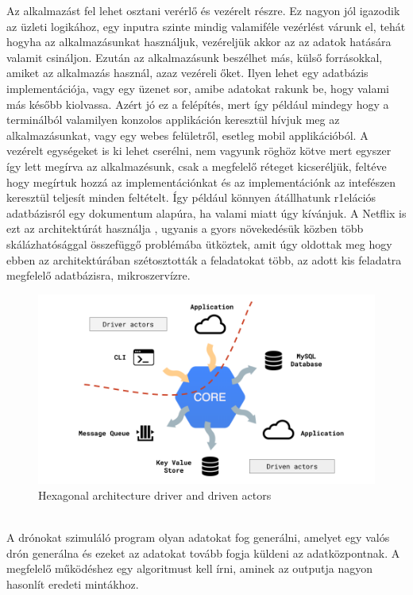 Az alkalmazást fel lehet osztani verérlő és vezérelt részre. Ez nagyon jól igazodik az üzleti logikához, egy inputra szinte mindig valamiféle vezérlést várunk el,
tehát hogyha az alkalmazásunkat használjuk, vezéreljük akkor az az adatok hatására valamit csináljon. Ezután az alkalmazásunk beszélhet más, külső forrásokkal, amiket az alkalmazás használ, azaz vezéreli őket.
Ilyen lehet egy adatbázis implementációja, vagy egy üzenet sor, amibe adatokat rakunk be, hogy valami más később kiolvassa.
Azért jó ez a felépítés, mert így például mindegy hogy a terminálból valamilyen konzolos applikáción keresztül hívjuk meg az alkalmazásunkat,
vagy egy webes felületről, esetleg mobil applikációból. A vezérelt egységeket is ki lehet cserélni, nem vagyunk röghöz kötve
mert egyszer így lett megírva az alkalmazésunk, csak a megfelelő réteget kicseréljük, feltéve hogy megírtuk hozzá az implementációnkat és az implementációnk
az intefészen keresztül teljesít minden feltételt. Így például könnyen átállhatunk r1elációs adatbázisról egy dokumentum alapúra, ha valami miatt úgy kívánjuk.
A Netflix is ezt az architektúrát használja \cite{netflix}, ugyanis a gyors növekedésük közben több skálázhatósággal összefüggő problémába ütköztek, amit úgy oldottak meg hogy
ebben az architektúrában szétosztották a feladatokat több, az adott kis feladatra megfelelő adatbázisra, mikroszervízre.
\begin{figure}[h]
    \centering
    \includegraphics[scale=0.3]{images/hexa-actor.png}
    \caption{Hexagonal architecture driver and driven actors}
    \label{fig:hexagonal-actor}
\end{figure}
\\
A drónokat szimuláló program olyan adatokat fog generálni, amelyet egy valós drón generálna és ezeket az adatokat tovább fogja küldeni az adatközpontnak.
A megfelelő működéshez egy algoritmust kell írni, aminek az outputja nagyon hasonlít eredeti mintákhoz.


